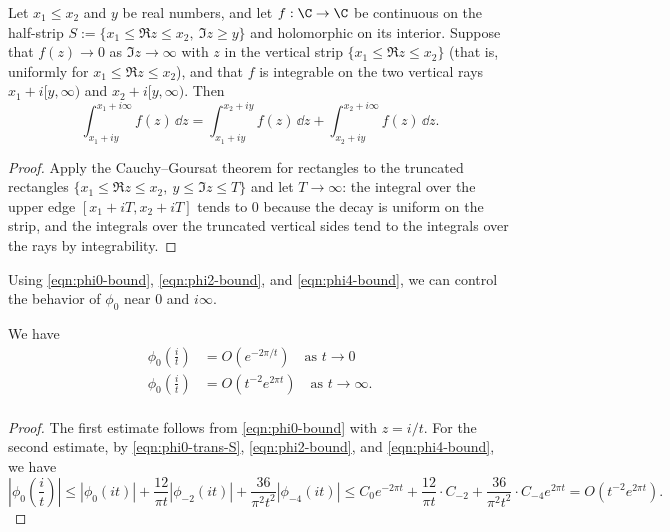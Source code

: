 \begin{lemma}\label{lem:CG-unbounded}\leanok\mathlibok
Let $x_1 \leq x_2$ and $y$ be real numbers, and let $f : \C \to \C$ be continuous on the half-strip $S := \{x_1 \leq \Re z \leq x_2,\ \Im z \geq y\}$ and holomorphic on its interior. Suppose that $f(z) \to 0$ as $\Im z \to \infty$ with $z$ in the vertical strip $\{x_1 \leq \Re z \leq x_2\}$ (that is, uniformly for $x_1 \leq \Re z \leq x_2$), and that $f$ is integrable on the two vertical rays $x_1 + i[y, \infty)$ and $x_2 + i[y, \infty)$. Then
\[
    \int_{x_1 + iy}^{x_1 + i\infty} f(z)\, \dd z
    = \int_{x_1 + iy}^{x_2 + iy} f(z)\, \dd z + \int_{x_2 + iy}^{x_2 + i\infty} f(z)\, \dd z.
\]
\end{lemma}
\begin{proof}\leanok
Apply the Cauchy--Goursat theorem for rectangles to the truncated rectangles $\{x_1 \leq \Re z \leq x_2,\ y \leq \Im z \leq T\}$ and let $T \to \infty$: the integral over the upper edge $[x_1 + iT, x_2 + iT]$ tends to $0$ because the decay is uniform on the strip, and the integrals over the truncated vertical sides tend to the integrals over the rays by integrability.
\end{proof}

Using \eqref{eqn:phi0-bound}, \eqref{eqn:phi2-bound}, and \eqref{eqn:phi4-bound}, we can control the behavior of $\phi_0$ near $0$ and $i\infty$.

\begin{corollary}\label{cor:phi0-near-0-infty}
We have
\begin{align}
    \phi_0\left(\frac{i}{t}\right) &= O(e^{-2 \pi / t}) \quad \text{as } t \to 0 \label{eqn:phi0-near-0} \\
    \phi_0\left(\frac{i}{t}\right) &= O(t^{-2}e^{2 \pi t}) \quad \text{as } t \to \infty. \label{eqn:phi0-near-infty} \\
\end{align}
\end{corollary}
\begin{proof}
The first estimate follows from \eqref{eqn:phi0-bound} with $z = i/t$.
For the second estimate, by \eqref{eqn:phi0-trans-S}, \eqref{eqn:phi2-bound}, and \eqref{eqn:phi4-bound}, we have
\begin{equation}
    \left|\phi_0\left(\frac{i}{t}\right)\right| \le |\phi_0(it)| + \frac{12}{\pi t} |\phi_{-2}(it)| + \frac{36}{\pi^2 t^2} |\phi_{-4}(it)|
    \le C_0 e^{-2 \pi t} + \frac{12}{\pi t} \cdot C_{-2} + \frac{36}{\pi^2 t^2} \cdot C_{-4} e^{2 \pi t} = O(t^{-2}e^{2 \pi t}).
\end{equation}
\end{proof}

